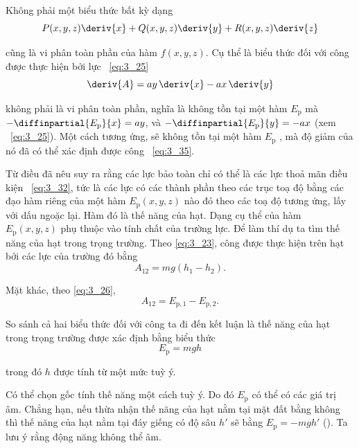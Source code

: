 Không phải một biểu thức bất kỳ dạng
\begin{equation*}
P(x,y,z)\deriv{x} + Q(x,y,z)\deriv{y} + R(x,y,z)\deriv{z}
\end{equation*}

\noindent
cũng là vi phân toàn phần của hàm $f(x,y,z)$. Cụ thể là biểu thức đối với công được thực hiện bởi lực ~\eqref{eq:3_25}
\begin{equation}\label{eq:3_35}
\deriv{A} = ay\,\deriv{x} - ax\,\deriv{y}
\end{equation}

\noindent
không phải là vi phân toàn phần, nghĩa là không tồn tại một hàm $E_{\text{p}}$ mà  $-\diffinpartial{E_{\text{p}}}{x}=ay$, và $-\diffinpartial{E_{\text{p}}}{y}=-ax$ (xem ~\eqref{eq:3_25}). Một cách tương ứng, sẽ không tồn tại một hàm $E_{\text{p}}$ , mà độ giảm của nó đã có thể xác định được công ~\eqref{eq:3_35}.

Từ điều đã nêu suy ra rằng các lực bảo toàn chỉ có thể là các lực thoả mãn điều kiện ~\eqref{eq:3_32}, tức là các lực có các thành phần theo các trục toạ độ bằng các đạo hàm riêng của một hàm  $E_{\text{p}}(x,y,z)$ nào đó theo các toạ độ tương ứng, lấy với dấu ngoặc lại. Hàm đó là thế năng của hạt. 
Dạng cụ thể của hàm $E_{\text{p}}(x,y,z)$ phụ thuộc vào tính chất của trường lực. Để làm thí dụ ta tìm thế năng của hạt trong trọng trường. Theo \eqref{eq:3_23}, công được thực hiện trên hạt bởi các lực của trường đó bằng 
\begin{equation*}
A_{12} = mg(h_1-h_2).
\end{equation*}

\noindent
Mặt khác, theo \eqref{eq:3_26},
\begin{equation*}
A_{12} = E_{\text{p},1} - E_{\text{p},2}.
\end{equation*}

\noindent
So sánh cả hai biểu thức đối với công ta đi đến kết luận là thế năng của hạt trong trọng trường được xác định bằng biểu thức    
\begin{equation}\label{eq:3_36}
E_{\text{p}} = mgh
\end{equation}

\noindent
trong đó $h$ được tính từ một mức tuỳ ý.

Có thể chọn gốc tính thế năng một cách tuỳ ý. Do đó $E_{\text{p}}$ có thể có các giá trị âm. Chẳng hạn, nếu thừa nhận thế năng của hạt nằm tại mặt đất bằng không thì thế năng của hạt nằm tại đáy giếng có độ sâu $h'$ sẽ bằng $E_{\text{p}}=-mgh'$ (). Ta lưu ý rằng động năng không thể âm. 


